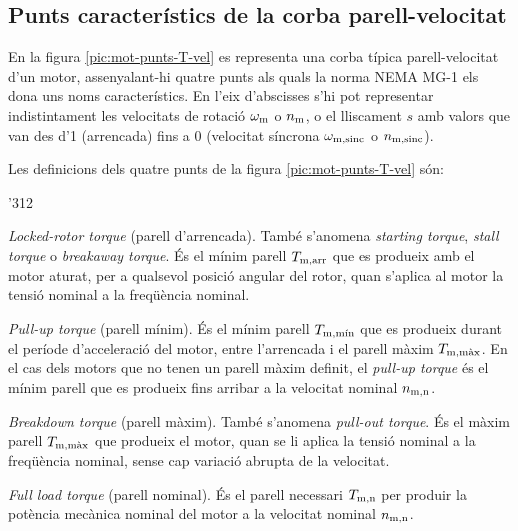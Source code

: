 \subsection{Punts característics de la corba parell-velocitat}

En la figura \vref{pic:mot-punts-T-vel} es representa una corba típica parell-velocitat d'un motor, assenyalant-hi quatre punts als quals la norma NEMA MG-1 els dona uns noms característics. En l'eix d'abscisses s'hi pot representar indistintament les velocitats de rotació $\omega_\mathrm{m}$ o $n_\mathrm{m}$, o  el lliscament $s$ amb valors que van des d'1 (arrencada) fins a 0 (velocitat síncrona $\omega_\mathrm{m,sinc}$ o $n_\mathrm{m,sinc}$).

\begin{center}
	
	\label{pic:mot-punts-T-vel}
\end{center}

Les definicions dels quatre punts de la figura  \vref{pic:mot-punts-T-vel} són:
\begin{dingautolist}{'312}
   \item \textit{Locked-rotor torque} (parell d'arrencada). També s'anomena \textit{starting torque}, \textit{stall torque} o \textit{breakaway torque}. És el mínim parell $T_\mathrm{m,arr}$ que es produeix amb el motor aturat, per a qualsevol posició angular del rotor, quan s'aplica al motor la tensió nominal a la freqüència nominal.
   \item \textit{Pull-up torque} (parell mínim). És el mínim parell $T_\mathrm{m,\text{mín}}$ que es produeix durant el període d'acceleració del motor, entre l'arrencada  i el parell màxim $T_\mathrm{m,\text{màx}}$. En el cas dels motors que no tenen un parell màxim definit, el \textit{pull-up torque} és el mínim parell que es produeix fins arribar a la velocitat nominal $n_\mathrm{m,n}$.
   \item \textit{Breakdown torque} (parell màxim). També s'anomena \textit{pull-out torque}. És el màxim parell $T_\mathrm{m,\text{màx}}$ que  produeix  el motor, quan se li aplica  la tensió nominal a la freqüència nominal, sense cap variació abrupta de la velocitat.
   \item \textit{Full load torque} (parell nominal). És el parell necessari $T_\mathrm{m,n}$ per produir la potència mecànica nominal del motor a la velocitat nominal  $n_\mathrm{m,n}$.
\end{dingautolist}

